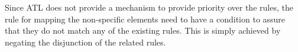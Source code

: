 Since ATL does not provide a mechanism to provide priority over the rules, the rule for mapping the non-specific elements need to have a condition to assure that they do not match any of the existing rules. This is simply achieved by negating the disjunction of the related rules. %
%
%
%
%
%

